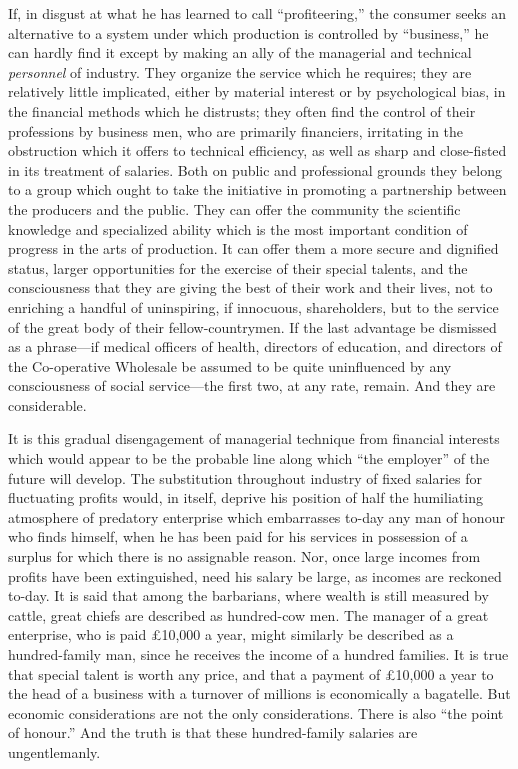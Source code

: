 \documentclass{book}
\begin{document}
If, in disgust at what he has learned to call “profiteering,” the consumer seeks an alternative to a system under which production is controlled by “business,” he can hardly find it except by making an ally of the managerial and technical \emph{personnel} of industry. They organize the service which he requires; they are relatively little implicated, either by material interest or by psychological bias, in the financial methods which he distrusts; they often find the control of their professions by business men, who are primarily financiers, irritating in the obstruction which it offers to technical efficiency, as well as sharp and close-fisted in its treatment of salaries. Both on public and professional grounds they belong to a group which ought to take the initiative in promoting a partnership between the producers and the public. They can offer the community the scientific knowledge and specialized ability which is the most important condition of progress in the arts of production. It can offer them a more secure and dignified status, larger opportunities for the exercise of their special talents, and the consciousness that they are giving the best of their work and their lives, not to enriching a handful of uninspiring, if innocuous, shareholders, but to the service of the great body of their fellow-countrymen. If the last advantage be dismissed as a phrase—if medical officers of health, directors of education, and directors of the Co-operative Wholesale be assumed to be quite uninfluenced by any consciousness of social service—the first two, at any rate, remain. And they are considerable.

It is this gradual disengagement of managerial technique from financial interests which would appear to be the probable line along which “the employer” of the future will develop. The substitution throughout industry of fixed salaries for fluctuating profits would, in itself, deprive his position of half the humiliating atmosphere of predatory enterprise which embarrasses to-day any man of honour who finds himself, when he has been paid for his services in possession of a surplus for which there is no assignable reason. Nor, once large incomes from profits have been extinguished, need his salary be large, as incomes are reckoned to-day. It is said that among the barbarians, where wealth is still measured by cattle, great chiefs are described as hundred-cow men. The manager of a great enterprise, who is paid £10,000 a year, might similarly be described as a hundred-family man, since he receives the income of a hundred families. It is true that special talent is worth any price, and that a payment of £10,000 a year to the head of a business with a turnover of millions is economically a bagatelle. But economic considerations are not the only considerations. There is also “the point of honour.” And the truth is that these hundred-family salaries are ungentlemanly.
\end{document}
